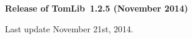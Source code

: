 \bigskip
{\bf Release of TomLib~1.2.5 (November 2014)}

\bigbreak
Last update November 21st, 2014.

\bye


